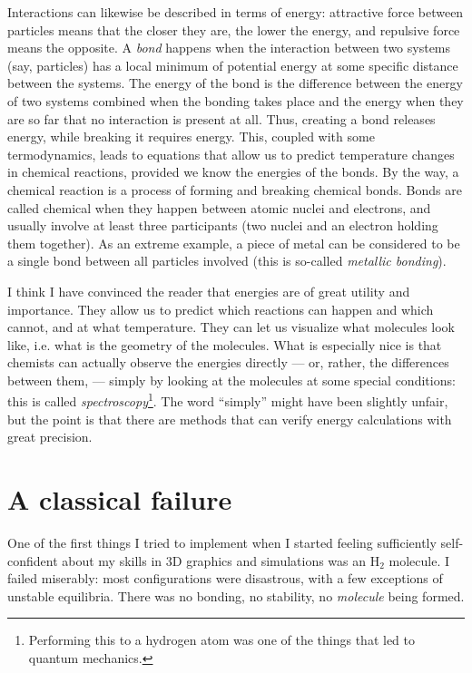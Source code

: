 \documentclass{article}
\newcommand{\molecule}[1]{\textrm{#1}}
\begin{document}
Interactions can likewise be described in terms of energy: attractive force between particles means that the closer they are, the lower the energy, and repulsive force means the opposite. A \textit{bond} happens when the interaction between two systems (say, particles) has a local minimum of potential energy at some specific distance between the systems. The energy of the bond is the difference between the energy of two systems combined when the bonding takes place and the energy when they are so far that no interaction is present at all. Thus, creating a bond releases energy, while breaking it requires energy. This, coupled with some termodynamics, leads to equations that allow us to predict temperature changes in chemical reactions, provided we know the energies of the bonds. By the way, a chemical reaction is a process of forming and breaking chemical bonds. Bonds are called chemical when they happen between atomic nuclei and electrons, and usually involve at least three participants (two nuclei and an electron holding them together). As an extreme example, a piece of metal can be considered to be a single bond between all particles involved (this is so-called \textit{metallic bonding}).

I think I have convinced the reader that energies are of great utility and importance. They allow us to predict which reactions can happen and which cannot, and at what temperature. They can let us visualize what molecules look like, i.e. what is the geometry of the molecules. What is especially nice is that chemists can actually observe the energies directly --- or, rather, the differences between them, --- simply by looking at the molecules at some special conditions: this is called \textit{spectroscopy}\footnote{Performing this to a hydrogen atom was one of the things that led to quantum mechanics.}. The word ``simply'' might have been slightly unfair, but the point is that there are methods that can verify energy calculations with great precision.

\newpage

\section{A classical failure}

One of the first things I tried to implement when I started feeling sufficiently self-confident about my skills in 3D graphics and simulations was an \(\molecule{H}_2\) molecule. I failed miserably: most configurations were disastrous, with a few exceptions of unstable equilibria. There was no bonding, no stability, no \textit{molecule} being formed.
\end{document}
